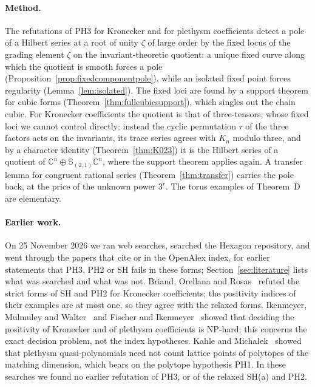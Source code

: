 \documentclass[11pt,a4paper]{article}
\theoremstyle{definition}
\newcommand{\C}{\mathbb{C}}
\begin{document}
\paragraph{Method.}
The refutations of PH3 for Kronecker and for plethysm coefficients detect a pole of a Hilbert series at a root of
unity $\zeta$ of large order by the fixed locus of the grading element
$\zeta$ on the invariant-theoretic quotient: a unique fixed curve along which
the quotient is smooth forces a pole (Proposition~\ref{prop:fixedcomponentpole}),
while an isolated fixed point forces regularity (Lemma~\ref{lem:isolated}).
The fixed loci are found by a support theorem for cubic forms
(Theorem~\ref{thm:fullcubicsupport}), which singles out the chain cubic. For
Kronecker coefficients the quotient is that of three-tensors, whose fixed loci
we cannot control directly; instead the cyclic permutation $\tau$ of the three
factors acts on the invariants, its trace series agrees with $K_n$ modulo
three, and by a character identity (Theorem~\ref{thm:K023}) it is the Hilbert
series of a quotient of $\C^n\oplus\mathbb S_{(2,1)}\C^n$, where the support
theorem applies again. A transfer lemma for congruent rational series
(Theorem~\ref{thm:transfer}) carries the pole back, at the price of the unknown power $3^r$.
The torus examples of Theorem~D are elementary.

\paragraph{Earlier work.}
On 25 November 2026 we ran web searches, searched the Hexagon repository, and
went through the papers that cite \cite{GCT6} or \cite{BOR} in the OpenAlex
index, for earlier statements that PH3, PH2 or SH fails in these forms;
Section~\ref{sec:literature} lists what was searched and what was not.
Briand, Orellana and Rosas~\cite{BOR} refuted the strict forms of SH and PH2
for Kronecker coefficients; the positivity indices of their examples are at
most one, so they agree with the relaxed forms. Ikenmeyer, Mulmuley and
Walter~\cite{IMW} and Fischer and Ikenmeyer~\cite{FI} showed that deciding the
positivity of Kronecker and of plethysm coefficients is NP-hard; this concerns
the exact decision problem, not the index hypotheses. Kahle and
Micha\l{}ek~\cite{KM} showed that plethysm quasi-polynomials need not count
lattice points of polytopes of the matching dimension, which bears on the
polytope hypothesis PH1. In these searches we found no earlier refutation of
PH3, or of the relaxed SH(a) and PH2.
\end{document}
